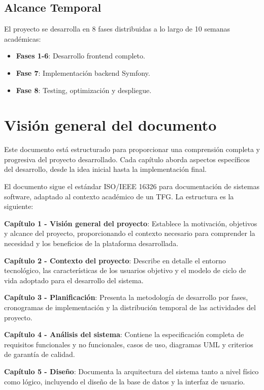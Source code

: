 \documentclass[12pt,a4paper,oneside]{report}
\providecommand{\tightlist}{%
  \setlength{\itemsep}{0pt}\setlength{\parskip}{0pt}}
\begin{document}
\subsection{Alcance Temporal}\label{alcance-temporal}

El proyecto se desarrolla en 8 fases distribuidas a lo largo de 10
semanas académicas:

\begin{itemize}
\tightlist
\item
  \textbf{Fases 1-6}: Desarrollo frontend completo.
\item
  \textbf{Fase 7}: Implementación backend Symfony.
\item
  \textbf{Fase 8}: Testing, optimización y despliegue.
\end{itemize}

\section{Visión general del
documento}\label{visiuxf3n-general-del-documento}

Este documento está estructurado para proporcionar una comprensión completa y progresiva del proyecto desarrollado. Cada capítulo aborda aspectos específicos del desarrollo, desde la idea inicial hasta la implementación final.

El documento sigue el estándar ISO/IEEE 16326 para documentación de sistemas software, adaptado al contexto académico de un TFG. La estructura es la siguiente:

\textbf{Capítulo 1 - Visión general del proyecto}: Establece la
motivación, objetivos y alcance del proyecto, proporcionando el contexto
necesario para comprender la necesidad y los beneficios de la plataforma
desarrollada.

\textbf{Capítulo 2 - Contexto del proyecto}: Describe en detalle el
entorno tecnológico, las características de los usuarios objetivo y el
modelo de ciclo de vida adoptado para el desarrollo del sistema.

\textbf{Capítulo 3 - Planificación}: Presenta la metodología de
desarrollo por fases, cronogramas de implementación y la distribución
temporal de las actividades del proyecto.

\textbf{Capítulo 4 - Análisis del sistema}: Contiene la especificación
completa de requisitos funcionales y no funcionales, casos de uso,
diagramas UML y criterios de garantía de calidad.

\textbf{Capítulo 5 - Diseño}: Documenta la arquitectura del sistema
tanto a nivel físico como lógico, incluyendo el diseño de la base de
datos y la interfaz de usuario.
\end{document}
